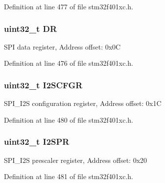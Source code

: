 Definition at line 477 of file stm32f401xc.\+h.

\subsubsection[{\texorpdfstring{DR}{DR}}]{ uint32\+\_\+t DR}\hypertarget{struct_s_p_i___type_def_a3df0d8dfcd1ec958659ffe21eb64fa94}{}\label{struct_s_p_i___type_def_a3df0d8dfcd1ec958659ffe21eb64fa94}
S\+PI data register, Address offset\+: 0x0C 

Definition at line 476 of file stm32f401xc.\+h.

\subsubsection[{\texorpdfstring{I2\+S\+C\+F\+GR}{I2SCFGR}}]{ uint32\+\_\+t I2\+S\+C\+F\+GR}\hypertarget{struct_s_p_i___type_def_aa0c41c8883cb0812d6aaf956c393584b}{}\label{struct_s_p_i___type_def_aa0c41c8883cb0812d6aaf956c393584b}
S\+P\+I\+\_\+\+I2S configuration register, Address offset\+: 0x1C 

Definition at line 480 of file stm32f401xc.\+h.

\subsubsection[{\texorpdfstring{I2\+S\+PR}{I2SPR}}]{ uint32\+\_\+t I2\+S\+PR}\hypertarget{struct_s_p_i___type_def_ab9be89a916ee5904381e10da10e5e8e9}{}\label{struct_s_p_i___type_def_ab9be89a916ee5904381e10da10e5e8e9}
S\+P\+I\+\_\+\+I2S prescaler register, Address offset\+: 0x20 

Definition at line 481 of file stm32f401xc.\+h.

